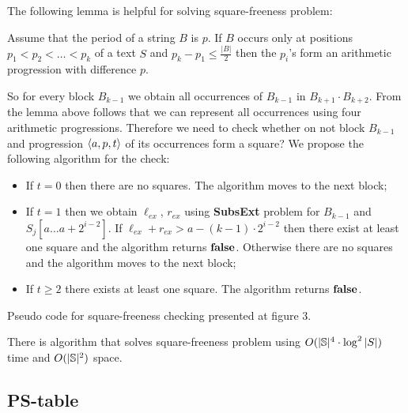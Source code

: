 ﻿\documentclass[11pt]{article}
\begin{document}
The following lemma is helpful for solving square-freeness problem:

\begin{lem}[{\rm\cite{2}}]
Assume that the period of a string $B$ is $p$. If $B$ occurs only at positions $p_1 < p_2 < \dots < p_k$ of a text
$S$ and $p_k - p_1 \leq \frac{|B|}{2}$ then the $p_i$'s form an arithmetic progression with difference $p$.
\end{lem}

\SquareFreenessCode

So for every block $B_{k-1}$ we obtain all occurrences of $B_{k-1}$ in $B_{k+1}\cdot B_{k+2}$. From the lemma
above follows that we can represent all occurrences using four arithmetic progressions. Therefore we need to check
whether on not block $B_{k-1}$ and progression $\langle a, p, t\rangle$ of its occurrences form a square? We propose the following
algorithm for the check:

\begin{itemize}
\item If $t = 0$ then there are no squares. The algorithm moves to the next block;

\item If $t = 1$ then we obtain $\ell_{ex}$, $r_{ex}$ using \textbf{SubsExt} problem for $B_{k-1}$ and $S_j[a\dots a +
2^{i-2}]$. If $\ell_{ex} + r_{ex} > a - (k-1)\cdot 2^{i-2}$ then there exist at least one square and the  algorithm returns
$\bf{false}$. Otherwise there are no squares and the algorithm moves to the next block;

\item If $t \geq 2$ there exists at least one square. The algorithm returns $\bf{false}$. 
\end{itemize}

Pseudo code for square-freeness checking presented at figure 3.

\begin{thm}
There is algorithm that solves square-freeness problem using $O(|\mathbb{S}|^4\cdot \log^2{|S|})$ time and $O(|\mathbb{S}|^2)$ space.
\end{thm}

\subsection{PS-table}
\end{document}
